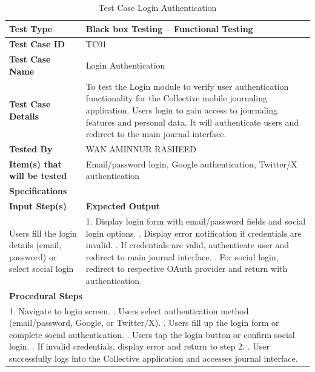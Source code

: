\begin{table}[H]
\centering
\caption{Test Case Login Authentication}
\label{tab:test-case-login}
\begin{tabular}{|p{4cm}|p{10cm}|}
\hline
\textbf{Test Type} & Black box Testing – Functional Testing \\
\hline
\textbf{Test Case ID} & TC01 \\
\hline
\textbf{Test Case Name} & Login Authentication \\
\hline
\textbf{Test Case Details} & To test the Login module to verify user authentication functionality for the Collective mobile journaling application. Users login to gain access to journaling features and personal data. It will authenticate users and redirect to the main journal interface. \\
\hline
\textbf{Tested By} & WAN AMINNUR RASHEED \\
\hline
\textbf{Item(s) that will be tested} & Email/password login, Google authentication, Twitter/X authentication \\
\hline
\multicolumn{2}{|l|}{\textbf{Specifications}} \\
\hline
\textbf{Input Step(s)} & \textbf{Expected Output} \\
\hline
Users fill the login details (email, password) or select social login & 1. Display login form with email/password fields and social login options. \newline 2. Display error notification if credentials are invalid. \newline 3. If credentials are valid, authenticate user and redirect to main journal interface. \newline 4. For social login, redirect to respective OAuth provider and return with authentication. \\
\hline
\multicolumn{2}{|l|}{\textbf{Procedural Steps}} \\
\hline
\multicolumn{2}{|p{14cm}|}{1. Navigate to login screen. \newline 2. Users select authentication method (email/password, Google, or Twitter/X). \newline 3. Users fill up the login form or complete social authentication. \newline 4. Users tap the login button or confirm social login. \newline 5. If invalid credentials, display error and return to step 2. \newline 6. User successfully logs into the Collective application and accesses journal interface.} \\
\hline
\end{tabular}
\end{table}

